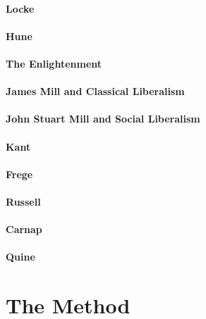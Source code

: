 \documentclass[10pt,titlepage]{book}
\begin{document}
\paragraph{Locke\cite{locke-stg,locke-t,locke-echu}}

\paragraph{Hune\cite{humeTHN,humeECHU}}

\paragraph{The Enlightenment}

\paragraph{James Mill and Classical Liberalism}

\paragraph{John Stuart Mill and Social Liberalism}

\paragraph{Kant\cite{kant-cpr}}

\paragraph{Frege\cite{fregeTPWF,frege1879,frege1884,frege1893,frege1903}}

\paragraph{Russell}

\paragraph{Carnap}

\paragraph{Quine}

\section{The Method}
\end{document}
